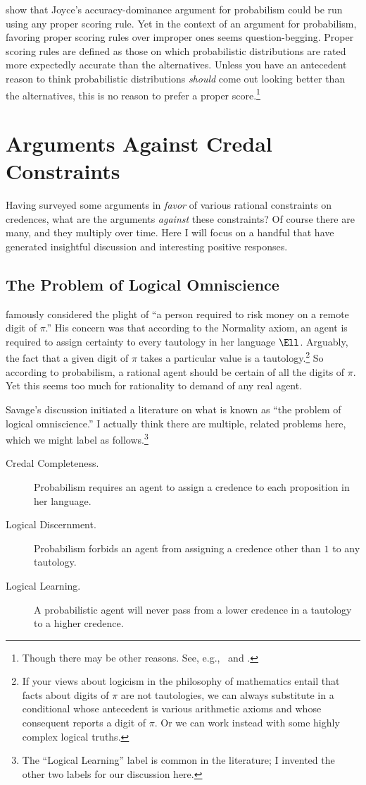 \citet{Predd} show that Joyce's accuracy-dominance argument for probabilism could be run using any proper scoring rule. Yet in the context of an argument for probabilism, favoring proper scoring rules over improper ones seems question-begging. Proper scoring rules are defined as those on which probabilistic distributions are rated more expectedly accurate than the alternatives. Unless you have an antecedent reason to think probabilistic distributions \emph{should} come out looking better than the alternatives, this is no reason to prefer a proper score.\footnote
{Though there may be other reasons. See, e.g.,\ \citet{JoyceAccuracy} and \citet{PettigrewLaws}.}

 
\section{Arguments Against Credal Constraints}
Having surveyed some arguments in \emph{favor} of various rational constraints on credences, what are the arguments \emph{against} these constraints? Of course there are many, and they multiply over time. Here I will focus on a handful that have generated insightful discussion and interesting positive responses.

\subsection{The Problem of Logical Omniscience} \label{ss:omni}
\citet{SavageDifficulties} famously considered the plight of ``a person required to risk money on a remote digit of $\pi$.'' His concern was that according to the Normality axiom, an agent is required to assign certainty to every tautology in her language $\Ell$. Arguably, the fact that a given digit of $\pi$ takes a particular value is a tautology.\footnote
{If your views about logicism in the philosophy of mathematics entail that facts about digits of $\pi$ are not tautologies, we can always substitute in a conditional whose antecedent is various arithmetic axioms and whose consequent reports a digit of $\pi$. Or we can work instead with some highly complex logical truths.}
 So according to probabilism, a rational agent should be certain of all the digits of $\pi$. Yet this seems too much for rationality to demand of any real agent.

Savage's discussion initiated a literature on what is known as ``the problem of logical omniscience.'' I actually think there are multiple, related problems here, which we might label as follows.\footnote{The ``Logical Learning'' label is common in the literature; I invented the other two labels for our discussion here.}
\begin{description}
\item[Credal Completeness.\,]{Probabilism requires an agent to assign a credence to each proposition in her language.}
\item[Logical Discernment.\,]{Probabilism forbids an agent from assigning a credence other than $1$ to any tautology.}
\item[Logical Learning.\,]{A probabilistic agent will never pass from a lower credence in a tautology to a higher credence.} 
\end{description}

